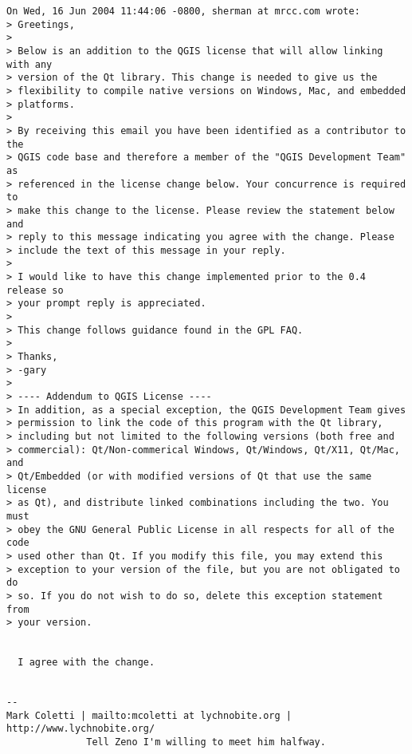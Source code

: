 \begin{small}
\begin{verbatim}
On Wed, 16 Jun 2004 11:44:06 -0800, sherman at mrcc.com wrote:
> Greetings,
> 
> Below is an addition to the QGIS license that will allow linking with any
> version of the Qt library. This change is needed to give us the
> flexibility to compile native versions on Windows, Mac, and embedded
> platforms.
> 
> By receiving this email you have been identified as a contributor to the
> QGIS code base and therefore a member of the "QGIS Development Team" as
> referenced in the license change below. Your concurrence is required to
> make this change to the license. Please review the statement below and
> reply to this message indicating you agree with the change. Please
> include the text of this message in your reply.
> 
> I would like to have this change implemented prior to the 0.4 release so
> your prompt reply is appreciated.
> 
> This change follows guidance found in the GPL FAQ.
> 
> Thanks,
> -gary
> 
> ---- Addendum to QGIS License ----
> In addition, as a special exception, the QGIS Development Team gives
> permission to link the code of this program with the Qt library,
> including but not limited to the following versions (both free and
> commercial): Qt/Non-commerical Windows, Qt/Windows, Qt/X11, Qt/Mac, and
> Qt/Embedded (or with modified versions of Qt that use the same license
> as Qt), and distribute linked combinations including the two. You must
> obey the GNU General Public License in all respects for all of the code
> used other than Qt. If you modify this file, you may extend this
> exception to your version of the file, but you are not obligated to do
> so. If you do not wish to do so, delete this exception statement from
> your version.


  I agree with the change.


--
Mark Coletti | mailto:mcoletti at lychnobite.org | http://www.lychnobite.org/
              Tell Zeno I'm willing to meet him halfway.



\end{verbatim}
\end{small}
